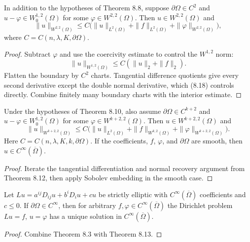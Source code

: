 \begin{theorem}
\label{gt-thm-8-12-global-w22}
In addition to the hypotheses of Theorem 8.8, suppose
$\partial\Omega\in C^2$ and $u-\varphi\in W_0^{1,2}(\Omega)$ for some
$\varphi\in W^{2,2}(\Omega)$. Then $u\in W^{2,2}(\Omega)$ and
\begin{equation}
\|u\|_{W^{2,2}(\Omega)}\leq C\bigl(\|u\|_{L^2(\Omega)}
 +\|f\|_{L^2(\Omega)}+\|\varphi\|_{W^{2,2}(\Omega)}\bigr),
\tag{8.25}
\end{equation}
where $C=C(n,\lambda,K,\partial\Omega)$.
\end{theorem}
\begin{proof}
\sketch Subtract $\varphi$ and use the coercivity estimate to control the
$W^{1,2}$ norm:
\begin{equation}
\tag{8.26}
\|u\|_{W^{1,2}(\Omega)}
\leq C(\|u\|_2+\|f\|_2).
\end{equation}
Flatten the boundary by $C^2$ charts. Tangential difference
quotients give every second derivative except the double normal derivative,
which (8.18) controls directly. Combine finitely many boundary charts with the
interior estimate.
\end{proof}

\begin{theorem}
\label{gt-thm-8-13-higher-global-regularity}
Under the hypotheses of Theorem 8.10, also assume
$\partial\Omega\in C^{k+2}$ and
$u-\varphi\in W_0^{1,2}(\Omega)$ for some
$\varphi\in W^{k+2,2}(\Omega)$. Then $u\in W^{k+2,2}(\Omega)$ and
\begin{equation}
\|u\|_{W^{k+2,2}(\Omega)}\leq C\bigl(\|u\|_{L^2(\Omega)}
 +\|f\|_{W^{k,2}(\Omega)}+\|\varphi\|_{W^{k+2,2}(\Omega)}\bigr).
\tag{8.27}
\end{equation}
Here $C=C(n,\lambda,K,k,\partial\Omega)$. If the coefficients, $f$, $\varphi$,
and $\partial\Omega$ are smooth, then $u\in C^\infty(\overline\Omega)$.
\end{theorem}
\begin{proof}
\sketch Iterate the tangential differentiation and normal recovery argument from
Theorem 8.12, then apply Sobolev embedding in the smooth case.
\end{proof}

\begin{theorem}
\label{gt-thm-8-14-smooth-classical-dirichlet}
Let $Lu=a^{ij}D_{ij}u+b^iD_iu+cu$ be strictly elliptic with
$C^\infty(\overline\Omega)$ coefficients and $c\leq0$. If
$\partial\Omega\in C^\infty$, then for arbitrary
$f,\varphi\in C^\infty(\overline\Omega)$ the Dirichlet problem
$Lu=f$, $u=\varphi$ has a unique solution in $C^\infty(\overline\Omega)$.
\end{theorem}
\begin{proof}
\sketch Combine Theorem 8.3 with Theorem 8.13.
\end{proof}

